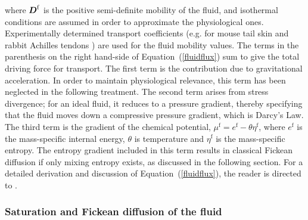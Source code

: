 \noindent where $\mbox{\boldmath$ D$}^\mathrm{f}$ is the positive semi-definite
mobility of the fluid, and isothermal conditions are assumed in order to
approximate the physiological ones. Experimentally determined
transport coefficients (e.g. for mouse tail skin \citep{Swartzetal:99}
and rabbit Achilles tendons \citep{Hanetal:2000}) are used for the
fluid mobility values. The terms in the parenthesis on the right
hand-side of \mbox{Equation (\ref{fluidflux})} sum to give the
total driving force for transport. The first term is the contribution
due to gravitational acceleration. In order to maintain physiological
relevance, this term has been neglected in the following
treatment. The second term arises from stress divergence; for an ideal
fluid, it reduces to a pressure gradient, thereby specifying that the
fluid moves down a compressive pressure gradient, which is Darcy's
Law. The third term is the gradient of the chemical
potential, $\mu^\mathrm{f} = e^\mathrm{f} - \theta \eta^\mathrm{f}$,
where $e^\mathrm{f}$ is the mass-specific internal energy, $\theta$ is
temperature and $\eta^\mathrm{f}$ is the mass-specific entropy. The
entropy gradient included in this term results in 
classical Fickean diffusion if only mixing entropy exists, as
discussed in the following section. For a
detailed derivation and discussion of \mbox{Equation
(\ref{fluidflux})}, the reader is directed to \citet{growthpaper}.




\subsubsection{Saturation and Fickean diffusion of the fluid}
\label{fick}

